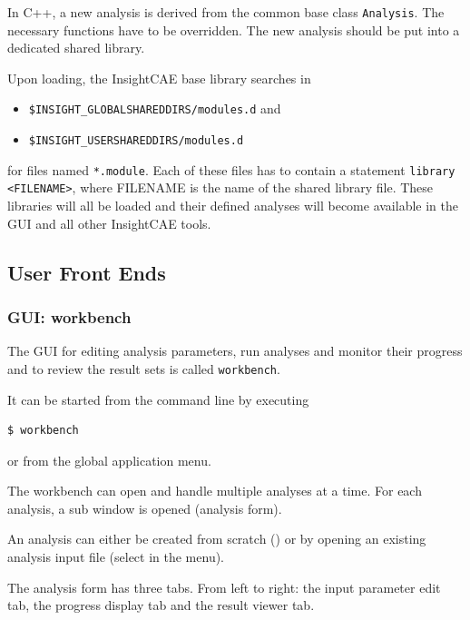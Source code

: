 In C++, a new analysis is derived from the common base class \texttt{Analysis}.
The necessary functions have to be overridden.
The new analysis should be put into a dedicated shared library.

Upon loading, the InsightCAE base library searches in 
\begin{itemize}
\item \texttt{\$INSIGHT\_GLOBALSHAREDDIRS/modules.d} and
\item \texttt{\$INSIGHT\_USERSHAREDDIRS/modules.d}
\end{itemize}
for files named \texttt{*.module}. 
Each of these files has to contain a statement \verb!library <FILENAME>!, where FILENAME is the name of the shared library file. These libraries will all be loaded and their defined analyses will become available in the GUI and all other InsightCAE tools.

\subsection{User Front Ends}

\subsubsection{GUI: workbench}
\label{sec:workbench}

The GUI for editing analysis parameters, run analyses and monitor their progress and to review the result sets is called \texttt{workbench}.

It can be started from the command line by executing
\begin{lstlisting}[language=bash]
$ workbench
\end{lstlisting}
or from the global application menu.

The workbench can open and handle multiple analyses at a time. For each analysis, a sub window is opened (analysis form).

An analysis can either be created from scratch () or by opening an existing analysis input file (select  in the menu).

The analysis form has three tabs. From left to right: the input parameter edit tab, the progress display tab and the result viewer tab.


